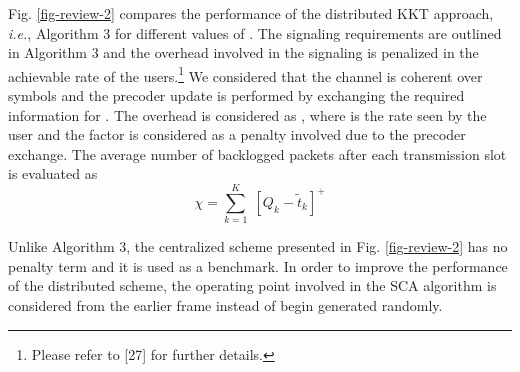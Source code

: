 \begin{enumerate}
	Fig. \ref{fig-review-2} compares the performance of the distributed \ac{KKT} approach, \textit{i.e.}, Algorithm 3 for different values of . The signaling requirements are outlined in Algorithm 3 and the overhead involved in the signaling is penalized in the achievable rate of the users.\footnote{Please refer to [27] for further details.} We considered that the channel is coherent over  symbols and the precoder update is performed by exchanging the required information for . The overhead is considered as , where  is the rate seen by the user and the factor  is considered as a penalty involved due to the precoder exchange. The average number of backlogged packets after each transmission slot is evaluated as 
	\begin{equation}
	\chi = \sum_{k = 1}^K \; [ Q_k - \tilde{t}_k ]^+
	\end{equation}
	
	Unlike Algorithm 3, the centralized scheme presented in Fig. \ref{fig-review-2} has no penalty term and it is used as a benchmark. In order to improve the performance of the distributed scheme, the operating point involved in the \ac{SCA} algorithm is considered from the earlier frame instead of begin generated randomly. 
	
	\begin{comment}
	Since we use \ac{KKT} approach, we can either use all users in the system for the precoder design or we can utilize single-cell MU-MIMO user selection presented in the literature to limit the number of users for which the precoders are designed, which leads to the faster convergence. As we can see from Fig. \ref{fig-review-2}, as the arrival rate per user increases, the performance of \ac{KKT} schemes with \eqn{J_{\max} = 3,5,10} converges since the number of backlogged packets are significantly large, therefore, the same set of users will be served by the algorithm with better precoders by utilizing the memory. 
	
	In spite of using memory and prior scheduling in the \ac{KKT} approach, isolated single \ac{BS} processing performs much better than the distributed scheme due to the limited number of iterations allowed in the algorithm. Note that the precoders are not updated for the desired users until convergence, after the limited number of iterations. However, if we perform the single cell precoder design by considering the neighboring precoders as fixed after the recent exchange as discussed in [28], we can improve the performance significantly for Algorithm 3 as shown by red curves in Fig. \ref{fig-review-2}. In this approach, in between each exchange across the coordinating \acp{BS}, each \ac{BS} will perform \eqn{J_{\max} = 20} with the neighboring precoders as fixed. Once the iterations are performed to update the precoders, it is then exchanged across the coordinating \acp{BS} to perform the same procedure as mentioned earlier. 
	\end{comment}


\end{enumerate}
